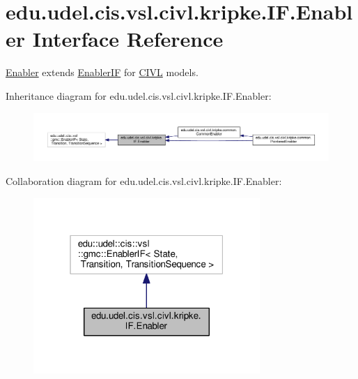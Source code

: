 \hypertarget{interfaceedu_1_1udel_1_1cis_1_1vsl_1_1civl_1_1kripke_1_1IF_1_1Enabler}{}\section{edu.\+udel.\+cis.\+vsl.\+civl.\+kripke.\+I\+F.\+Enabler Interface Reference}
\label{interfaceedu_1_1udel_1_1cis_1_1vsl_1_1civl_1_1kripke_1_1IF_1_1Enabler}


\hyperlink{interfaceedu_1_1udel_1_1cis_1_1vsl_1_1civl_1_1kripke_1_1IF_1_1Enabler}{Enabler} extends \hyperlink{}{Enabler\+I\+F} for \hyperlink{classedu_1_1udel_1_1cis_1_1vsl_1_1civl_1_1CIVL}{C\+I\+V\+L} models.  




Inheritance diagram for edu.\+udel.\+cis.\+vsl.\+civl.\+kripke.\+I\+F.\+Enabler\+:
\nopagebreak
\begin{figure}[H]
\begin{center}
\leavevmode
\includegraphics[width=350pt]{interfaceedu_1_1udel_1_1cis_1_1vsl_1_1civl_1_1kripke_1_1IF_1_1Enabler__inherit__graph}
\end{center}
\end{figure}


Collaboration diagram for edu.\+udel.\+cis.\+vsl.\+civl.\+kripke.\+I\+F.\+Enabler\+:
\nopagebreak
\begin{figure}[H]
\begin{center}
\leavevmode
\includegraphics[width=244pt]{interfaceedu_1_1udel_1_1cis_1_1vsl_1_1civl_1_1kripke_1_1IF_1_1Enabler__coll__graph}
\end{center}
\end{figure}
